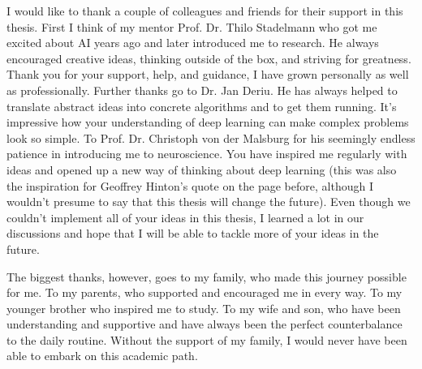 I would like to thank a couple of colleagues and friends for their support in this thesis.
First I think of my mentor Prof. Dr. Thilo Stadelmann who got me excited about AI years ago and later introduced me to research.
He always encouraged creative ideas, thinking outside of the box, and striving for greatness.
Thank you for your support, help, and guidance, I have grown personally as well as professionally.
Further thanks go to Dr. Jan Deriu. 
He has always helped to translate abstract ideas into concrete algorithms and to get them running.
It's impressive how your understanding of deep learning can make complex problems look so simple.
To Prof. Dr. Christoph von der Malsburg for his seemingly endless patience in introducing me to neuroscience.
You have inspired me regularly with ideas and opened up a new way of thinking about deep learning (this was also the inspiration for Geoffrey Hinton's quote on the page before, although I wouldn't presume to say that this thesis will change the future).
Even though we couldn't implement all of your ideas in this thesis, I learned a lot in our discussions and hope that I will be able to tackle more of your ideas in the future.

The biggest thanks, however, goes to my family, who made this journey possible for me.
To my parents, who supported and encouraged me in every way.
To my younger brother who inspired me to study.
To my wife and son, who have been understanding and supportive and have always been the perfect counterbalance to the daily routine.
Without the support of my family, I would never have been able to embark on this academic path.
\normalsize
